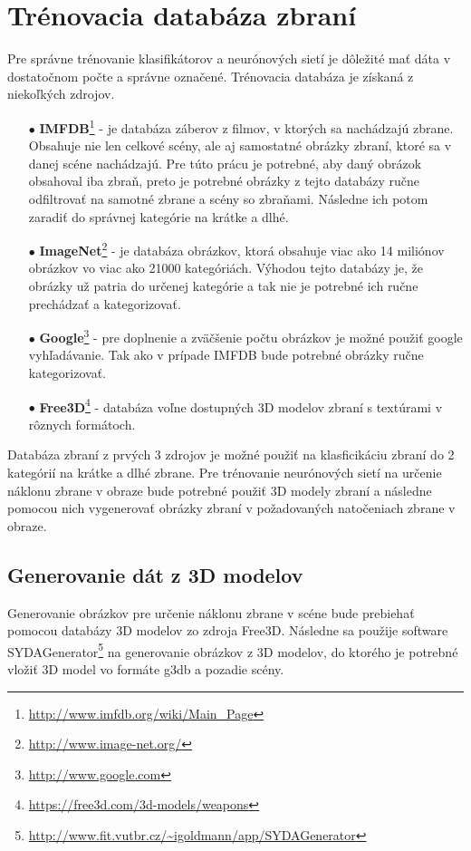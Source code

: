 
\section{Trénovacia databáza zbraní}
\label{sec:databaza}
Pre správne trénovanie klasifikátorov a neurónových sietí je dôležité mať dáta v dostatočnom počte a správne označené.
Trénovacia databáza je získaná z niekoľkých zdrojov.
\begin{enumerate}
    \item[$\bullet$] \textbf{IMFDB}\footnote{\url{http://www.imfdb.org/wiki/Main_Page}} - je databáza záberov z filmov, v ktorých sa nachádzajú zbrane.
    Obsahuje nie len celkové scény, ale aj samostatné obrázky zbraní, ktoré sa v danej scéne nachádzajú.
    Pre túto prácu je potrebné, aby daný obrázok obsahoval iba zbraň, preto je potrebné obrázky z tejto databázy ručne odfiltrovať na samotné zbrane a scény so zbraňami.
    Následne ich potom zaradiť do správnej kategórie na krátke a dlhé.
    \item[$\bullet$] \textbf{ImageNet}\footnote{\url{http://www.image-net.org/}} - je databáza obrázkov, ktorá obsahuje viac ako 14 miliónov obrázkov vo viac ako 21000 kategóriách.
    Výhodou tejto databázy je, že obrázky už patria do určenej kategórie a tak nie je potrebné ich ručne prechádzať a kategorizovať.
    \item[$\bullet$] \textbf{Google}\footnote{\url{http://www.google.com}} - pre doplnenie a zväčšenie počtu obrázkov je možné použiť google vyhľadávanie.
    Tak ako v prípade IMFDB bude potrebné obrázky ručne kategorizovať.
    \item[$\bullet$] \textbf{Free3D}\footnote{\url{https://free3d.com/3d-models/weapons}} - databáza voľne dostupných 3D modelov zbraní s textúrami v rôznych formátoch.
\end{enumerate}

Databáza zbraní z prvých 3 zdrojov je možné použiť na klasficikáciu zbraní do 2 kategórií na krátke a dlhé zbrane.
Pre trénovanie neurónových sietí na určenie náklonu zbrane v obraze bude potrebné použiť 3D modely zbraní a následne pomocou nich vygenerovať
    obrázky zbraní v požadovaných natočeniach zbrane v obraze.

\subsection{Generovanie dát z 3D modelov}
\label{subsec:generovanie3d}
Generovanie obrázkov pre určenie náklonu zbrane v scéne bude prebiehať pomocou databázy 3D modelov zo zdroja Free3D.
Následne sa použije software SYDAGenerator\footnote{\url{http://www.fit.vutbr.cz/~igoldmann/app/SYDAGenerator}} na generovanie obrázkov z 3D modelov,
    do ktorého je potrebné vložiť 3D model vo formáte g3db a pozadie scény.

